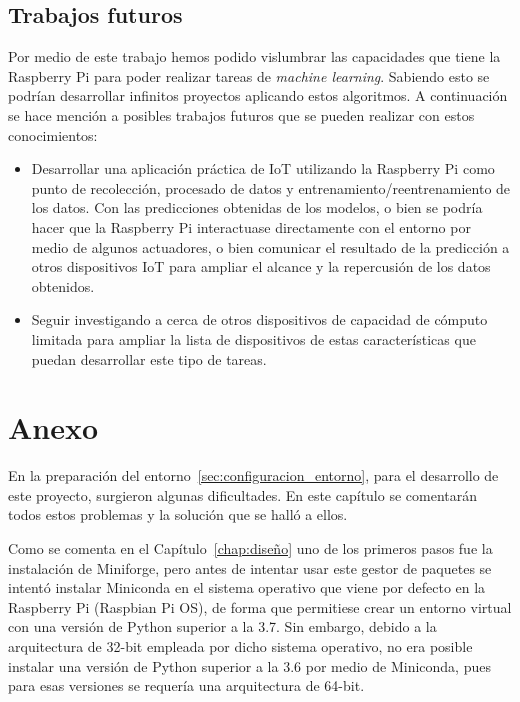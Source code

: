 \documentclass[a4paper, 12pt]{book}
\begin{document}
\section{Trabajos futuros}
\label{sec:trabajos_futuros}

Por medio de este trabajo hemos podido vislumbrar las capacidades que tiene la Raspberry Pi para poder realizar tareas de \textit{machine learning}. Sabiendo esto se podrían desarrollar infinitos proyectos aplicando estos algoritmos. A continuación se hace mención a posibles trabajos futuros que se pueden realizar con estos conocimientos:

\begin{itemize}
    \item Desarrollar una aplicación práctica de IoT utilizando la Raspberry Pi como punto de recolección, procesado de datos y entrenamiento/reentrenamiento de los datos. Con las predicciones obtenidas de los modelos, o bien se podría hacer que la Raspberry Pi interactuase directamente con el entorno por medio de algunos actuadores, o bien comunicar el resultado de la predicción a otros dispositivos IoT para ampliar el alcance y la repercusión de los datos obtenidos.
    
    \item Seguir investigando a cerca de otros dispositivos de capacidad de cómputo limitada para ampliar la lista de dispositivos de estas características que puedan desarrollar este tipo de tareas.
\end{itemize}

\chapter{Anexo}
\label{chap:anexo}

En la preparación del entorno~\ref{sec:configuracion_entorno}, para el desarrollo de este proyecto, surgieron algunas dificultades. En este capítulo se comentarán todos estos problemas y la solución que se halló a ellos.

Como se comenta en el Capítulo~\ref{chap:diseño} uno de los primeros pasos fue la instalación de Miniforge, pero antes de intentar usar este gestor de paquetes se intentó instalar Miniconda en el sistema operativo que viene por defecto en la Raspberry Pi (Raspbian Pi OS), de forma que permitiese crear un entorno virtual con una versión de Python superior a la 3.7. Sin embargo, debido a la arquitectura de 32-bit empleada por dicho sistema operativo, no era posible instalar una versión de Python superior a la 3.6 por medio de Miniconda, pues para esas versiones se requería una arquitectura de 64-bit.
\end{document}

